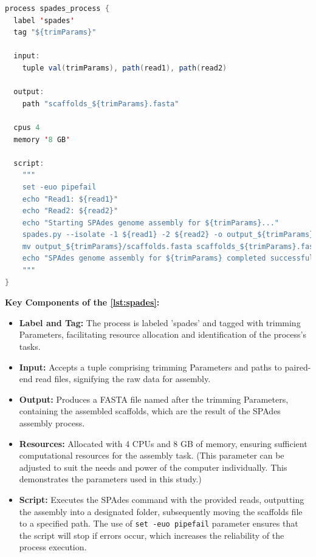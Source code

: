 \begin{lstlisting}[language=Java, label={lst:spades}, caption={SPAdes genome assembly process in Nextflow.}]
process spades_process {
  label 'spades'
  tag "${trimParams}"

  input:
    tuple val(trimParams), path(read1), path(read2)
    
  output:
    path "scaffolds_${trimParams}.fasta"

  cpus 4
  memory '8 GB'

  script:
    """
    set -euo pipefail
    echo "Read1: ${read1}"
    echo "Read2: ${read2}"
    echo "Starting SPAdes genome assembly for ${trimParams}..."
    spades.py --isolate -1 ${read1} -2 ${read2} -o output_${trimParams}
    mv output_${trimParams}/scaffolds.fasta scaffolds_${trimParams}.fasta
    echo "SPAdes genome assembly for ${trimParams} completed successfully."
    """
}
\end{lstlisting}

\textbf{Key Components of the \autoref{lst:spades}:}

\begin{itemize}
    \item \textbf{Label and Tag:} The process is labeled 'spades' and tagged with \gls{trimming} Parameters, facilitating resource allocation and identification of the process's tasks.
    \item \textbf{Input:} Accepts a tuple comprising \gls{trimming} Parameters and paths to paired-end \gls{read} files, signifying the raw data for \gls{assembly}.
    \item \textbf{Output:} Produces a FASTA file named after the \gls{trimming} Parameters, containing the assembled \gls{scaffold}s, which are the result of the SPAdes assembly process.
    \item \textbf{Resources:} Allocated with 4 CPUs and 8 GB of memory, ensuring sufficient computational resources for the assembly task. (This parameter can be adjusted to suit the needs and power of the computer individually. This demonstrates the parameters used in this study.)
    \item \textbf{Script:} Executes the SPAdes command with the provided \gls{read}s, outputting the \gls{assembly} into a designated folder, subsequently moving the \gls{scaffold}s file to a specified path. The use of \texttt{set -euo pipefail} parameter ensures that the script will stop if errors occur, which increases the reliability of the process execution.
\end{itemize}


